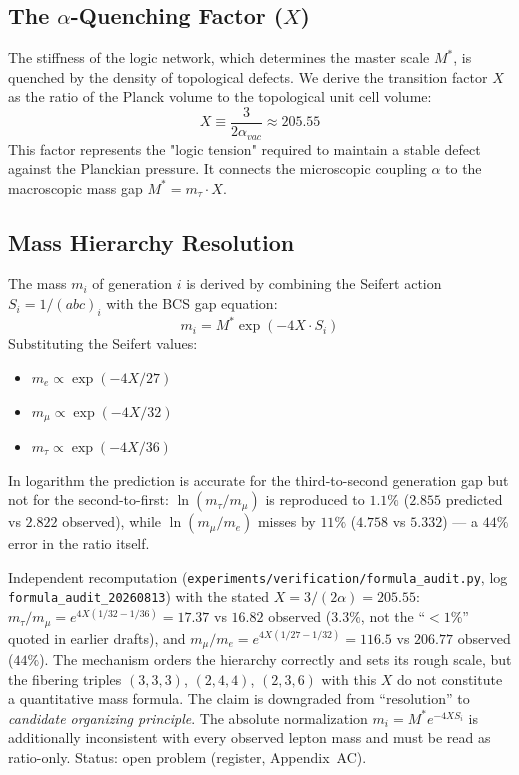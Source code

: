 \subsection{The $\alpha$-Quenching Factor ($X$)}
The stiffness of the logic network, which determines the master scale $M^*$, is quenched by the density of topological defects. We derive the transition factor $X$ as the ratio of the Planck volume to the topological unit cell volume:
\begin{equation}
    X \equiv \frac{3}{2 \alpha_{vac}} \approx 205.55
\end{equation}
This factor represents the "logic tension" required to maintain a stable defect against the Planckian pressure. It connects the microscopic coupling $\alpha$ to the macroscopic mass gap $M^* = m_\tau \cdot X$.

\subsection{Mass Hierarchy Resolution}
The mass $m_i$ of generation $i$ is derived by combining the Seifert action $S_i = 1/(abc)_i$ with the BCS gap equation:
\begin{equation}
    m_i = M^* \exp\left( - 4X \cdot S_i \right)
\end{equation}
Substituting the Seifert values:
\begin{itemize}
    \item $m_e \propto \exp(-4X/27)$
    \item $m_\mu \propto \exp(-4X/32)$
    \item $m_\tau \propto \exp(-4X/36)$
\end{itemize}
In logarithm the prediction is accurate for the third-to-second generation gap but not for the second-to-first: $\ln(m_\tau/m_\mu)$ is reproduced to $1.1\%$ ($2.855$ predicted vs $2.822$ observed), while $\ln(m_\mu/m_e)$ misses by $11\%$ ($4.758$ vs $5.332$) --- a $44\%$ error in the ratio itself.

\begin{mdframed}[backgroundcolor=yellow!8, frametitle={2026 numerical audit (Seifert exponentials)}]
Independent recomputation (\texttt{experiments/\allowbreak verification/\allowbreak formula\_\allowbreak audit.py}, log \texttt{formula\_audit\_20260813}) with the stated $X = 3/(2\alpha) = 205.55$: $m_\tau/m_\mu = e^{4X(1/32-1/36)} = 17.37$ vs $16.82$ observed ($3.3\%$, not the ``$<1\%$'' quoted in earlier drafts), and $m_\mu/m_e = e^{4X(1/27-1/32)} = 116.5$ vs $206.77$ observed ($44\%$). The mechanism orders the hierarchy correctly and sets its rough scale, but the fibering triples $(3,3,3)$, $(2,4,4)$, $(2,3,6)$ with this $X$ do not constitute a quantitative mass formula. The claim is downgraded from ``resolution'' to \emph{candidate organizing principle}. The absolute normalization $m_i = M^* e^{-4XS_i}$ is additionally inconsistent with every observed lepton mass and must be read as ratio-only. Status: open problem (register, Appendix~AC).
\end{mdframed}

